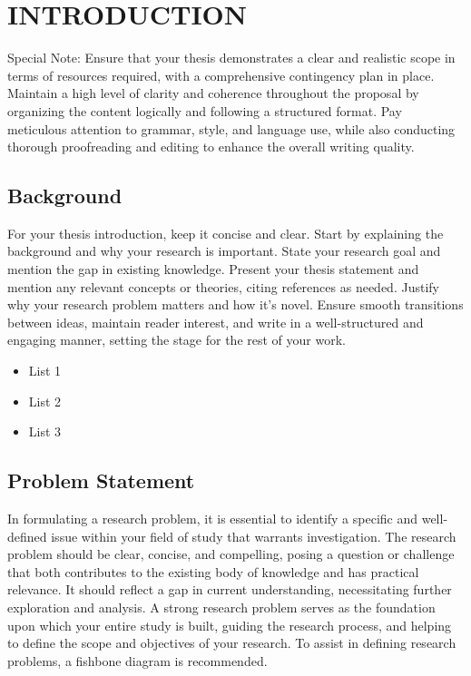 \chapter{INTRODUCTION}
\label{chap:introduction}
\thispagestyle{fancy}
	
Special Note: Ensure that your thesis demonstrates a clear and realistic scope in terms of resources required, with a comprehensive contingency plan in place. Maintain a high level of clarity and coherence throughout the proposal by organizing the content logically and following a structured format. Pay meticulous attention to grammar, style, and language use, while also conducting thorough proofreading and editing to enhance the overall writing quality.

\section{Background}
\label{sec:background}
For your thesis introduction, keep it concise and clear. Start by explaining the background and why your research is important. State your research goal and mention the gap in existing knowledge. Present your thesis statement and mention any relevant concepts or theories, citing references as needed. Justify why your research problem matters and how it's novel. Ensure smooth transitions between ideas, maintain reader interest, and write in a well-structured and engaging manner, setting the stage for the rest of your work.

\begin{itemize}
	\item List 1
	\item List 2
	\item List 3
\end{itemize}

	\section{Problem Statement}
	\label{sec:problem-statement}
	In formulating a research problem, it is essential to identify a specific and well-defined issue within your field of study that warrants investigation. The research problem should be clear, concise, and compelling, posing a question or challenge that both contributes to the existing body of knowledge and has practical relevance. It should reflect a gap in current understanding, necessitating further exploration and analysis. A strong research problem serves as the foundation upon which your entire study is built, guiding the research process, and helping to define the scope and objectives of your research. To assist in defining research problems, a fishbone diagram is recommended.

